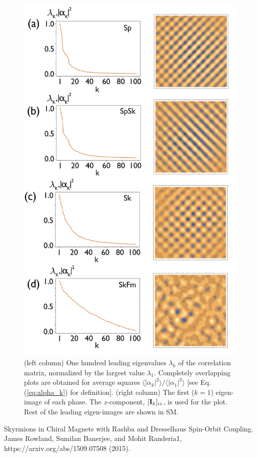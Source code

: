 \documentclass[reprint,amsmath,amssymb,aps,showpacs,superscriptaddress,prl]{revtex4-1}
\begin{document}
\begin{figure}[h]
\includegraphics[scale=0.3]{fig1.png}
\caption{(left column) One hundred leading eigenvalues $\lambda_k$ of the correlation matrix, normalized by the largest value $\lambda_1$. Completely overlapping plots are obtained for average squares $\langle |\alpha_k |^2 \rangle / \langle |\alpha_1 |^2 \rangle$ [see Eq. (\ref{eq:alpha_k}) for definition]. (right column) The first ($k=1$) eigen-image of each phase. The $z$-component, $[{\bf I}_k ]_{iz}$, is used for the plot. Rest of the leading eigen-images are shown in SM. }\label{fig:0}
\end{figure}


\begin{thebibliography}{99}

\bibitem{} Skyrmions in Chiral Magnets with Rashba and Dresselhaus Spin-Orbit Coupling. James Rowland, Sumilan Banerjee, and Mohit Randeria1, https://arxiv.org/abs/1509.07508 (2015).


\end{thebibliography}

%
%
\end{document}
